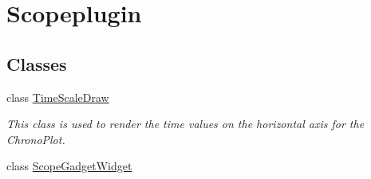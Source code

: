 \hypertarget{group__scopeplugin}{\section{Scopeplugin}
\label{group__scopeplugin}
}
\subsection*{Classes}
\begin{DoxyCompactItemize}
\item 
class \hyperlink{class_time_scale_draw}{Time\-Scale\-Draw}
\begin{DoxyCompactList}\small\item\em This class is used to render the time values on the horizontal axis for the Chrono\-Plot. \end{DoxyCompactList}\item 
class \hyperlink{class_scope_gadget_widget}{Scope\-Gadget\-Widget}
\end{DoxyCompactItemize}
